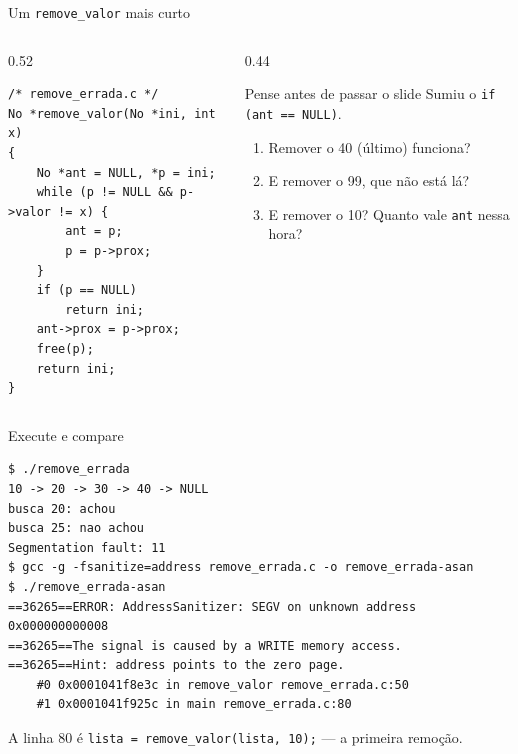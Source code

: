 \documentclass[aspectratio=169]{beamer}
\begin{document}
\begin{frame}[fragile]{Um \texttt{remove\_valor} mais curto}
  \begin{columns}[c]
    \begin{column}{0.52\textwidth}
\begin{lstlisting}[style=tinyC]
/* remove_errada.c */
No *remove_valor(No *ini, int x)
{
    No *ant = NULL, *p = ini;
    while (p != NULL && p->valor != x) {
        ant = p;
        p = p->prox;
    }
    if (p == NULL)
        return ini;
    ant->prox = p->prox;
    free(p);
    return ini;
}
\end{lstlisting}
    \end{column}
    \begin{column}{0.44\textwidth}
      \begin{block}{Pense antes de passar o slide}
        \small Sumiu o \texttt{if (ant == NULL)}.
        \begin{enumerate}
          \item Remover o 40 (último) funciona?
          \item E remover o 99, que não está lá?
          \item E remover o 10? Quanto vale \texttt{ant} nessa hora?
        \end{enumerate}
      \end{block}
    \end{column}
  \end{columns}
\end{frame}

\begin{frame}[fragile]{Execute e compare}
\begin{lstlisting}[style=shellStyle]
$ ./remove_errada
10 -> 20 -> 30 -> 40 -> NULL
busca 20: achou
busca 25: nao achou
Segmentation fault: 11
$ gcc -g -fsanitize=address remove_errada.c -o remove_errada-asan
$ ./remove_errada-asan
==36265==ERROR: AddressSanitizer: SEGV on unknown address 0x000000000008
==36265==The signal is caused by a WRITE memory access.
==36265==Hint: address points to the zero page.
    #0 0x0001041f8e3c in remove_valor remove_errada.c:50
    #1 0x0001041f925c in main remove_errada.c:80
\end{lstlisting}
  \begin{center}
    \scriptsize\textcolor{UFSGray}{A linha 80 é \texttt{lista =
    remove\_valor(lista, 10);} --- a primeira remoção.}
  \end{center}
\end{frame}
\end{document}
